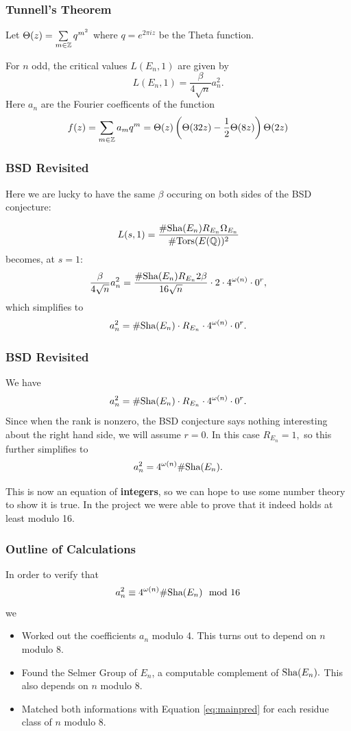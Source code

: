 \documentclass{beamer}
\begin{document}
\begin{frame}
  \frametitle{Tunnell's Theorem}
  Let $\Theta(z) = \sum\limits_{m \in {\mathbb Z}} q^{m^2}$ where $q = e^{2 \pi i z}$ be
  the Theta function. \pause
  \begin{theorem}
    For $n$ odd, the critical values $L(E_n,1)$ are given by
    \[L(E_n,1) = \frac{\beta}{4\sqrt{n}} a_n^2.\]
    Here $a_n$ are the Fourier coefficents of the function
    \[f(z) = \sum\limits_{m \in {\mathbb Z}} a_m q^m = \Theta(z) \left( \Theta(32z)
      - \frac{1}{2}\Theta(8z)\right) \Theta(2z)\]
  \end{theorem}
\end{frame}

\begin{frame}
  \frametitle{BSD Revisited}
  Here we are lucky to have the same $\beta$ occuring on both sides of the BSD
  conjecture: 

  \[L(s,1) = \frac{\# \text{\normalfont Sha}(E_n) R_{E_n} \Omega_{E_n}}{\#{\text{\normalfont Tors}}(E({\mathbb Q}))^2}\] 
  becomes, at $s = 1$: \pause
  \[\frac{\beta}{4 \sqrt{n}} a_n^2 = \frac{\# \text{\normalfont Sha}(E_n) R_{E_n} 2 \beta}{
      16 \sqrt{n}} \cdot 2 \cdot 4^{\omega(n)} \cdot 0^r,\] \pause
  which simplifies to
  \[a_n^2 = \# \text{\normalfont Sha}(E_n) \cdot R_{E_n} \cdot 4^{\omega(n)} \cdot 0^r.\]

\end{frame}

\begin{frame}
  \frametitle{BSD Revisited}
  We have
  \[a_n^2 = \# \text{\normalfont Sha}(E_n) \cdot R_{E_n} \cdot 4^{\omega(n)} \cdot 0^r.\]
  Since when the rank is nonzero, the BSD conjecture says nothing interesting
  about the right hand side, we will assume $r = 0$. In this case $R_{E_n} = 1,$
  so this further simplifies to
  \[a_n^2 = 4^{\omega(n)} \# \text{\normalfont Sha}(E_n).\] \pause

  This is now an equation of \textbf{integers}, so we can hope to use some
  number theory to show it is true. In the project we were able to prove that it
  indeed holds at least modulo 16.
\end{frame}

\begin{frame}
  \frametitle{Outline of Calculations}
  In order to verify that
  \begin{equation} \label{eq:mainpred}
    a_n^2 \equiv 4^{\omega(n)} \# \text{\normalfont Sha}(E_n) \mod{16}
  \end{equation}
  we
  \begin{itemize}
  \item Worked out the coefficients $a_n$ modulo 4. This turns out to
    depend on $n$ modulo 8.
  \item Found the Selmer Group of $E_n$, a computable complement of
    $\text{\normalfont Sha}(E_n).$ This also depends on $n$ modulo 8.
  \item Matched both informations with Equation \autoref{eq:mainpred}
    for each residue class
    of $n$ modulo 8.
  \end{itemize}
\end{frame}
\end{document}
